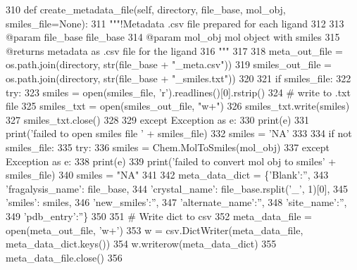 \begin{DoxyCode}
310     \textcolor{keyword}{def }create\_metadata\_file(self, directory, file\_base, mol\_obj, smiles\_file=None):
311         \textcolor{stringliteral}{"""!Metadata .csv file prepared for each ligand}
312 \textcolor{stringliteral}{}
313 \textcolor{stringliteral}{        @param file\_base file\_base }
314 \textcolor{stringliteral}{        @param mol\_obj mol object with smiles}
315 \textcolor{stringliteral}{        @returns metadata as .csv file for the ligand}
316 \textcolor{stringliteral}{        """}
317 
318         meta\_out\_file = os.path.join(directory, str(file\_base + \textcolor{stringliteral}{"\_meta.csv"}))
319         smiles\_out\_file = os.path.join(directory, str(file\_base + \textcolor{stringliteral}{"\_smiles.txt"}))
320 
321         \textcolor{keywordflow}{if} smiles\_file:
322             \textcolor{keywordflow}{try}:
323                 smiles = open(smiles\_file, \textcolor{stringliteral}{'r').readlines()[0].rstrip()}
324 \textcolor{stringliteral}{                }\textcolor{comment}{# write to .txt file}
325                 smiles\_txt = open(smiles\_out\_file, \textcolor{stringliteral}{"w+"})
326                 smiles\_txt.write(smiles)
327                 smiles\_txt.close()
328 
329             \textcolor{keywordflow}{except} Exception \textcolor{keyword}{as} e:
330                 print(e)
331                 print(\textcolor{stringliteral}{'failed to open smiles file '} + smiles\_file)
332                 smiles = \textcolor{stringliteral}{'NA'}
333 
334         \textcolor{keywordflow}{if} \textcolor{keywordflow}{not} smiles\_file:
335             \textcolor{keywordflow}{try}:
336                 smiles = Chem.MolToSmiles(mol\_obj)
337             \textcolor{keywordflow}{except} Exception \textcolor{keyword}{as} e:
338                 print(e)
339                 print(\textcolor{stringliteral}{'failed to convert mol obj to smiles'} + smiles\_file)
340                 smiles = \textcolor{stringliteral}{"NA"}
341 
342         meta\_data\_dict = \{\textcolor{stringliteral}{'Blank'}:\textcolor{stringliteral}{''},
343                           \textcolor{stringliteral}{'fragalysis\_name'}: file\_base,
344                           \textcolor{stringliteral}{'crystal\_name'}: file\_base.rsplit(\textcolor{stringliteral}{'\_'}, 1)[0],
345                           \textcolor{stringliteral}{'smiles'}: smiles,
346                           \textcolor{stringliteral}{'new\_smiles'}:\textcolor{stringliteral}{''},
347                           \textcolor{stringliteral}{'alternate\_name'}:\textcolor{stringliteral}{''},
348                           \textcolor{stringliteral}{'site\_name'}:\textcolor{stringliteral}{''},
349                           \textcolor{stringliteral}{'pdb\_entry'}:\textcolor{stringliteral}{''}\}
350 
351         \textcolor{comment}{# Write dict to csv}
352         meta\_data\_file = open(meta\_out\_file, \textcolor{stringliteral}{'w+'})
353         w = csv.DictWriter(meta\_data\_file, meta\_data\_dict.keys())
354         w.writerow(meta\_data\_dict)
355         meta\_data\_file.close()
356 
\end{DoxyCode}
